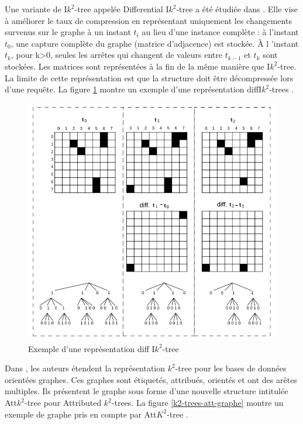 Une variante de I$k^2$-tree appelée Differential I$k^2$-tree a été étudiée dans \citep{alvarez2017succinct}. Elle vise à améliorer le taux de compression en représentant uniquement les changements survenus sur le graphe à un instant $t_i$ au lieu d'une instance complète : à l'instant $t_0$, une capture complète du graphe (matrice d'adjacence) est stockée. À l 'instant $t_k$, pour k>0, seules les arrêtes qui changent de valeurs entre $t_{k-1}$ et $t_k$ sont stockées. Les matrices sont représentées à la fin de la même manière que I$k^2$-tree. La limite de cette représentation est que la structure doit être décompressée lors d'une requête.
La figure \ref{Ik2-trees-diff} montre un exemple d'une représentation diffI$k^2$-trees \citep{alvarez2017succinct}.

\begin{figure}[H]
\begin{center}
\includegraphics[scale=0.8]{./ressources/image/Ik2-trees-diff.png} 
\end{center}
\caption{Exemple d'une représentation diff I$k^2$-tree}
\label{Ik2-trees-diff}
\end{figure}

Dans \citep{alvarez2018compact}, les auteurs étendent la représentation $k^2$-tree pour les bases de données orientées graphes. Ces graphes sont étiquetés, attribués, orientés et ont des arêtes multiples. Ils présentent le graphe sous forme d'une nouvelle structure intitulée Att$k^2$-tree pour Attributed $k^2$-trees.
La figure \ref{k2-trees-att-graphe} montre un exemple de graphe pris en compte par Att$K^2$-tree \citep{alvarez2018compact}.

